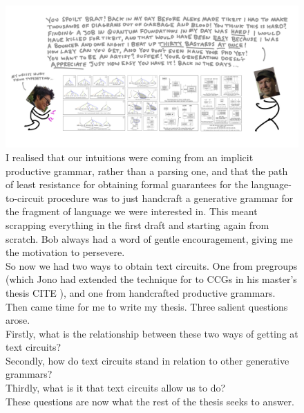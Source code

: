 \begin{figure}[h!]
\includegraphics{figures/cartoons/bigpaper1}
\caption{I realised that our intuitions were coming from an implicit productive grammar, rather than a parsing one, and that the path of least resistance for obtaining formal guarantees for the language-to-circuit procedure was to just handcraft a generative grammar for the fragment of language we were interested in. This meant scrapping everything in the first draft and starting again from scratch. Bob always had a word of gentle encouragement, giving me the motivation to persevere.\\

So now we had two ways to obtain text circuits. One from pregroups (which Jono had extended the technique for to CCGs in his master's thesis \bR CITE \e), and one from handcrafted productive grammars. Then came time for me to write my thesis. Three salient questions arose.\\

Firstly, what is the relationship between these two ways of getting at text circuits?\\

Secondly, how do text circuits stand in relation to other generative grammars?\\

Thirdly, what is it that text circuits allow us to do?\\

These questions are now what the rest of the thesis seeks to answer.
}
\end{figure}